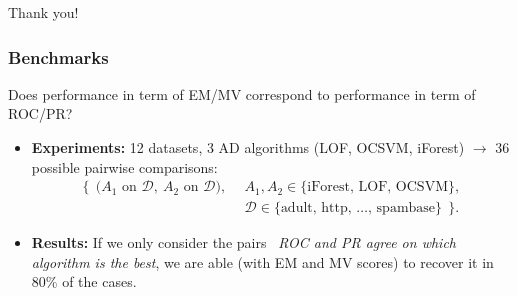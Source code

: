 \documentclass[10pt]{beamer}
\newcommand{\st}{\text{\emph{s.t.}}{}}
\begin{document}
\begin{frame}
\centering
\Large{Thank you!}
\end{frame}



\begin{frame}
\frametitle{Benchmarks}
\begin{block}{Does performance in term of EM/MV correspond to performance in term of ROC/PR?}

\begin{itemize}
\item \textbf{Experiments:}
{\small
12 datasets, 3 AD algorithms (LOF, OCSVM, iForest)
$\to$ 36 possible pairwise comparisons:
\begin{align*}
\bigg\{~~\Big(A_1 \text{~on~} \mathcal{D},~ A_2 \text{~on~} \mathcal{D}\Big),~~ & A_1, A_2 \in \{\text{iForest, LOF, OCSVM}\}, \\
& \mathcal{D} \in \{\text{adult, http, \ldots, spambase}\} ~~\bigg\}.
\end{align*}
}


\item \textbf{Results:}
{ \small
If we only consider the pairs \st~\emph{ROC and PR agree on which algorithm is the best}, we are able (with EM and MV scores) to recover it in $80\%$ of the cases.
}
\end{itemize}


\end{block}
\end{frame}
\end{document}
